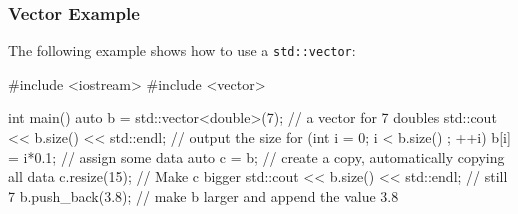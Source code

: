 \documentclass[aspectratio=169,ignorenonframetext,11pt]{beamer}
\def\inline{\lstinline[basicstyle=\small\ttfamily]}
\begin{document}


\begin{frame}[fragile]
\frametitle{Vector Example}
The following example shows how to use a \inline!std::vector!:
\begin{cppcode}
#include <iostream>
#include <vector>

int main()
{
    auto b = std::vector<double>(7); // a vector for 7 doubles
    std::cout << b.size() << std::endl; // output the size
    for (int i = 0; i < b.size() ; ++i)
        b[i] = i*0.1; // assign some data
    auto c = b; // create a copy, automatically copying all data
    c.resize(15); // Make c bigger
    std::cout << b.size() << std::endl; // still 7
    b.push_back(3.8); // make b larger and append the value 3.8
}
\end{cppcode}
\end{frame}
\end{document}
